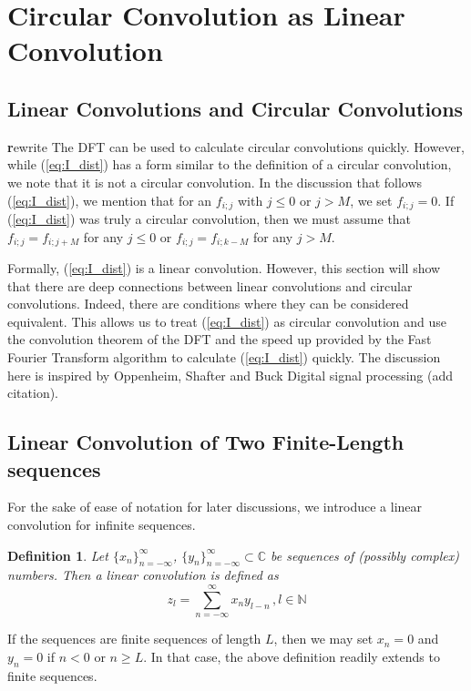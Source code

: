 \documentclass[12pt]{CSUNthesis}
\newtheorem{definition}{Definition}
\begin{document}
\section{Circular Convolution as Linear Convolution}
\subsection{Linear Convolutions and Circular Convolutions}
{\textbf rewrite} The DFT can be used to calculate circular convolutions quickly. However, while (\ref{eq:I_dist}) has a form similar to the definition of a circular convolution, we note that it is not a circular convolution. In the discussion that follows (\ref{eq:I_dist}), we mention that for an $f_{i;j}$ with $j \leq 0$ or $j > M$, we set $f_{i;j}=0$. If (\ref{eq:I_dist}) was truly a circular convolution, then we must assume that $f_{i;j}=f_{i;j+M}$ for any $j \leq 0$ or $f_{i;j}=f_{i;k-M}$ for any $j > M$. 

Formally, (\ref{eq:I_dist}) is a linear convolution. However, this section will show that there are deep connections between linear convolutions and circular convolutions. Indeed, there are conditions where they can be considered equivalent. This allows us to treat (\ref{eq:I_dist}) as circular convolution and use the convolution theorem of the DFT and the speed up provided by the Fast Fourier Transform algorithm to calculate (\ref{eq:I_dist}) quickly. The discussion here is inspired by Oppenheim, Shafter and Buck Digital signal processing (add citation).

\subsection{Linear Convolution of Two Finite-Length sequences}
\label{sec:lin_conv_fin_seq}
For the sake of ease of notation for later discussions, we introduce a linear convolution for infinite sequences. 
\begin{definition}
Let $\{x_n\}_{n=-\infty}^{\infty}$, $\{y_n\}_{n=-\infty}^{\infty} \subset \mathbb{C}$ be sequences of (possibly complex) numbers. Then a linear convolution is defined as 
\begin{equation}
\label{eq:lin_conv}
z_{l}=\sum_{n=-\infty}^{\infty} x_{n}y_{l-n}\, , l \in \mathbb{N}
\end{equation}
\end{definition}


If the sequences are finite sequences of length $L$, then we may set $x_n=0$ and $y_n=0$ if $n<0$ or $n \geq L$. In that case, the above definition readily extends to finite sequences.
\end{document}

